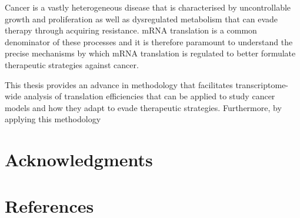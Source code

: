 \documentclass[
  12pt,
  openany]{book}
\begin{document}
Cancer is a vastly heterogeneous disease that is characterised by uncontrollable growth and proliferation as well as dysregulated metabolism that can evade therapy through acquiring resistance. mRNA translation is a common denominator of these processes and it is therefore paramount to understand the precise mechanisms by which mRNA translation is regulated to better formulate therapeutic strategies against cancer.

This thesis provides an advance in methodology that facilitates transcriptome-wide analysis of translation efficiencies that can be applied to study cancer models and how they adapt to evade therapeutic strategies. Furthermore, by applying this methodology

\hypertarget{acknowledgments}{%
\chapter*{Acknowledgments}\label{acknowledgments}}

\hypertarget{references}{%
\chapter*{References}\label{references}}
\end{document}
